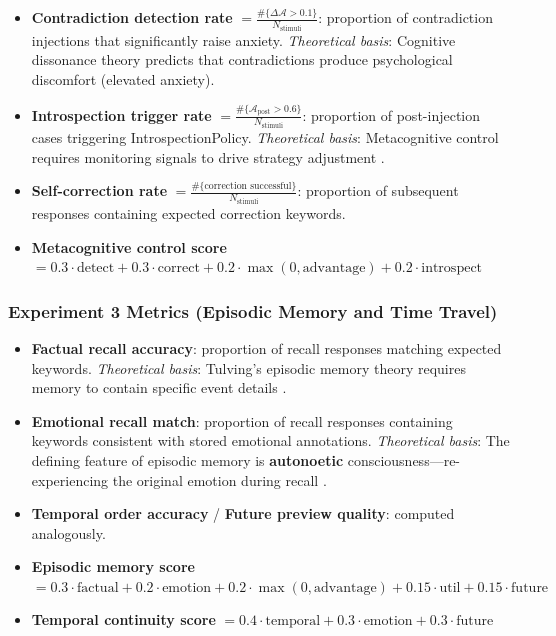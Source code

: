 \documentclass[pdflatex,sn-mathphys-num]{sn-jnl}
\newcommand{\anxiety}{\mathcal{A}}
\theoremstyle{thmstyleone}%
\theoremstyle{thmstyletwo}%
\theoremstyle{thmstylethree}%
\begin{document}
\begin{itemize}[leftmargin=2em]
    \item \textbf{Contradiction detection rate} $= \frac{\#\{\Delta\anxiety > 0.1\}}{N_{\text{stimuli}}}$: proportion of contradiction injections that significantly raise anxiety. \textit{Theoretical basis}: Cognitive dissonance theory \cite{festinger1957cognitive} predicts that contradictions produce psychological discomfort (elevated anxiety).

    \item \textbf{Introspection trigger rate} $= \frac{\#\{\anxiety_{\text{post}} > 0.6\}}{N_{\text{stimuli}}}$: proportion of post-injection cases triggering IntrospectionPolicy. \textit{Theoretical basis}: Metacognitive control requires monitoring signals to drive strategy adjustment \cite{kawato2023metacognitive}.

    \item \textbf{Self-correction rate} $= \frac{\#\{\text{correction successful}\}}{N_{\text{stimuli}}}$: proportion of subsequent responses containing expected correction keywords.

    \item \textbf{Metacognitive control score} $= 0.3 \cdot \text{detect} + 0.3 \cdot \text{correct} + 0.2 \cdot \max(0, \text{advantage}) + 0.2 \cdot \text{introspect}$
\end{itemize}

\subsubsection{Experiment 3 Metrics (Episodic Memory and Time Travel)}

\begin{itemize}[leftmargin=2em]
    \item \textbf{Factual recall accuracy}: proportion of recall responses matching expected keywords. \textit{Theoretical basis}: Tulving's episodic memory theory requires memory to contain specific event details \cite{tulving1985memory}.

    \item \textbf{Emotional recall match}: proportion of recall responses containing keywords consistent with stored emotional annotations. \textit{Theoretical basis}: The defining feature of episodic memory is \textbf{autonoetic} consciousness---re-experiencing the original emotion during recall \cite{hayes2021replay}.

    \item \textbf{Temporal order accuracy} / \textbf{Future preview quality}: computed analogously.

    \item \textbf{Episodic memory score} $= 0.3 \cdot \text{factual} + 0.2 \cdot \text{emotion} + 0.2 \cdot \max(0, \text{advantage}) + 0.15 \cdot \text{util} + 0.15 \cdot \text{future}$

    \item \textbf{Temporal continuity score} $= 0.4 \cdot \text{temporal} + 0.3 \cdot \text{emotion} + 0.3 \cdot \text{future}$
\end{itemize}
\end{document}
